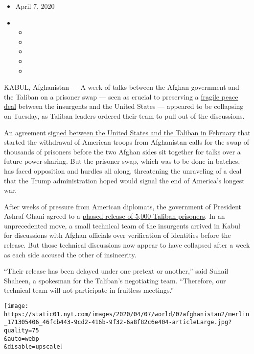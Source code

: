 \begin{itemize}
\item
  April 7, 2020
\item
  \begin{itemize}
  \item
  \item
  \item
  \item
  \item
  \end{itemize}
\end{itemize}

KABUL, Afghanistan --- A week of talks between the Afghan government and
the Taliban on a prisoner swap --- seen as crucial to preserving a
\href{https://www.nytimes.com/2020/02/29/world/asia/us-taliban-deal.html}{fragile
peace deal} between the insurgents and the United States --- appeared to
be collapsing on Tuesday, as Taliban leaders ordered their team to pull
out of the discussions.

An agreement
\href{https://www.nytimes.com/2020/02/29/world/asia/us-taliban-deal.html}{signed
between the United States and the Taliban in February} that started the
withdrawal of American troops from Afghanistan calls for the swap of
thousands of prisoners before the two Afghan sides sit together for
talks over a future power-sharing. But the prisoner swap, which was to
be done in batches, has faced opposition and hurdles all along,
threatening the unraveling of a deal that the Trump administration hoped
would signal the end of America's longest war.

After weeks of pressure from American diplomats, the government of
President Ashraf Ghani agreed to a
\href{https://www.nytimes.com/2020/03/23/world/asia/afghanistan-taliban-peace-coronavirus.html}{phased
release of 5,000 Taliban prisoners}. In an unprecedented move, a small
technical team of the insurgents arrived in Kabul for discussions with
Afghan officials over verification of identities before the release. But
those technical discussions now appear to have collapsed after a week as
each side accused the other of insincerity.

``Their release has been delayed under one pretext or another,'' said
Suhail Shaheen, a spokesman for the Taliban's negotiating team.
``Therefore, our technical team will not participate in fruitless
meetings.''

\texttt{[image: https://static01.nyt.com/images/2020/04/07/world/07afghanistan2/merlin\_171305406\_46fcb443-9cd2-416b-9f32-6a8f82c6e404-articleLarge.jpg?quality=75\\\&auto=webp\\\&disable=upscale]}

